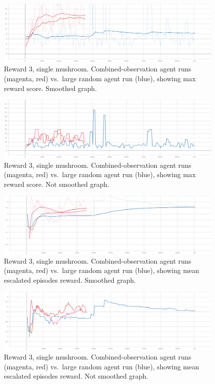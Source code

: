 \documentclass[]{article}
\begin{document}
\begin{figure}
\centering
\includegraphics{./img/114090517-d4b4fc00-98b7-11eb-969b-e0598c294397.png}
\caption{Reward 3, single mushroom. Combined-observation agent runs
(magenta, red) vs.~large random agent run (blue), showing max reward
score. Smoothed graph.}
\end{figure}

\begin{figure}
\centering
\includegraphics{./img/114090547-dd0d3700-98b7-11eb-83b5-9127ac49814b.png}
\caption{Reward 3, single mushroom. Combined-observation agent runs
(magenta, red) vs.~large random agent run (blue), showing max reward
score. Not smoothed graph.}
\end{figure}

\begin{figure}
\centering
\includegraphics{./img/114090659-0201aa00-98b8-11eb-9b32-1d111a988ecb.png}
\caption{Reward 3, single mushroom. Combined-observation agent runs
(magenta, red) vs.~large random agent run (blue), showing mean escalated
episodes reward. Smoothed graph.}
\end{figure}

\begin{figure}
\centering
\includegraphics{./img/114090695-0c23a880-98b8-11eb-9e70-874fcbd055fb.png}
\caption{Reward 3, single mushroom. Combined-observation agent runs
(magenta, red) vs.~large random agent run (blue), showing mean escalated
episodes reward. Not smoothed graph.}
\end{figure}
\end{document}
